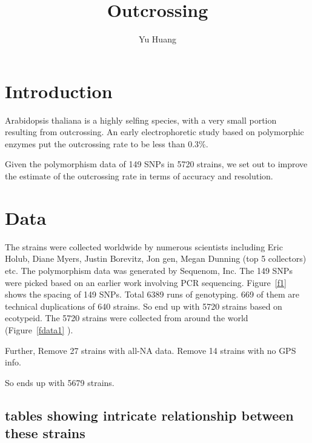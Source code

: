 \documentclass[a4paper,10pt]{article}
\title{Outcrossing}
\author{Yu Huang}
\begin{document}
\maketitle

\begin{abstract}

\end{abstract}

\tableofcontents

\section{Introduction}
Arabidopsis thaliana is a highly selfing species, with a very small portion resulting from outcrossing. An early electrophoretic study based on polymorphic enzymes\cite{Abbott1989} put the outcrossing rate to be less than 0.3\%.

Given the polymorphism data of 149 SNPs in 5720 strains, we set out to improve the estimate of the outcrossing rate in terms of accuracy and resolution.

\section{Data}
The strains were collected worldwide by numerous scientists including Eric Holub, Diane Myers, Justin Borevitz, Jon gen, Megan Dunning (top 5 collectors) etc. The polymorphism data was generated by Sequenom, Inc. The 149 SNPs were picked based on an earlier work involving PCR sequencing\cite{Nordborg2005}. Figure~\ref{f1} shows the spacing of 149 SNPs.
Total 6389 runs of genotyping. 669 of them are technical duplications of 640 strains. So end up with 5720 strains based on ecotypeid. The 5720 strains were collected from around the world (Figure~\ref{fdata1} ).

Further, Remove 27 strains with all-NA data. Remove 14 strains with no GPS info.

So ends up with 5679 strains.

\subsection{tables showing intricate relationship between these strains}

\end{document}
